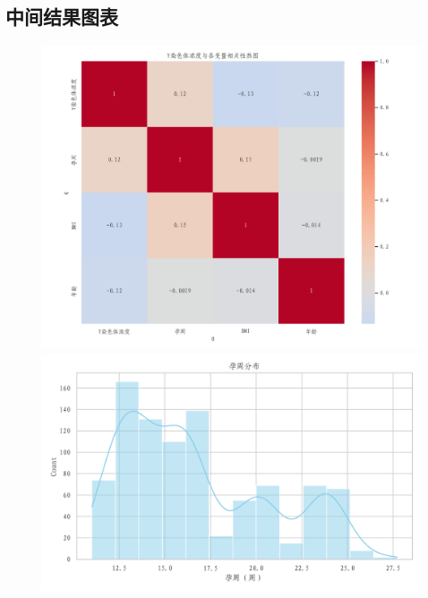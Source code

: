 \documentclass[withoutpreface,bwprint]{cumcmthesis} %
\begin{document}
\begin{appendices}
    \section{中间结果图表}
        \begin{figure}[H]
        \centering
        \begin{minipage}{0.49\textwidth}
            \centering
            \includegraphics[width=\textwidth]{../figure/C1_Output/correlation_heatmap.png}
        \end{minipage}
        \begin{minipage}{0.49\textwidth}
            \centering
            \includegraphics[width=\textwidth]{../figure/C1_Output/hist_gestational_week.png}
        \end{minipage}

\end{figure}
\end{appendices}
\end{document}
